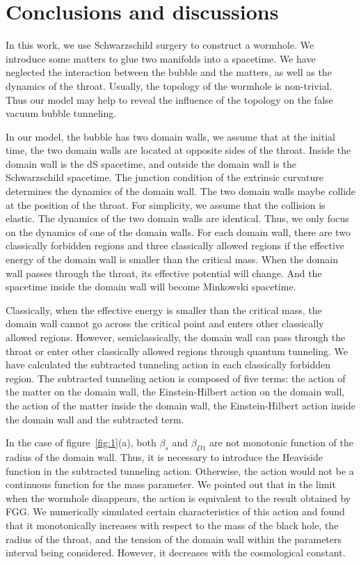 \documentclass[12pt]{article}
\begin{document}
\section{Conclusions and discussions}
\label{sec:5}
In this work, we use Schwarzschild surgery to construct a wormhole.  We introduce some matters to glue two manifolds into a spacetime. We have neglected the interaction between the bubble and the matters, as well as the dynamics of the throat. Usually, the topology of the wormhole is non-trivial. Thus our model may help to reveal the influence of the topology on the false vacuum bubble tunneling.

In our model, the bubble has two domain walls, we assume that at the initial time, the two domain walls are located at opposite sides of the throat.  Inside the domain wall is the dS spacetime, and outside the domain wall is the Schwarzschild spacetime. The junction condition of the extrinsic curvature determines the dynamics of the domain wall. The two domain walls maybe collide at the position of the throat. For simplicity, we assume that the collision is elastic. The dynamics of the two domain walls are identical. Thus, we only focus on the dynamics of one of the domain walls. For each domain wall, there are two classically forbidden regions and three classically allowed regions if the effective  energy of the domain wall is smaller than the critical mass. When the domain wall passes through the throat, its effective potential will change. And the spacetime inside the domain wall will become Minkowski spacetime.

Classically, when the effective energy is smaller than the critical mass, the domain wall cannot go across the critical point and enters other classically allowed regions.  However, semiclassically, the domain wall can pass through the throat or enter other classically allowed regions through quantum tunneling. We have calculated the subtracted tunneling action in each classically forbidden region. The subtracted tunneling action is composed of five terms: the action of the matter on the domain wall, the Einstein-Hilbert action on the domain wall, the action of the matter inside the domain wall, the Einstein-Hilbert action inside the domain wall and the subtracted term.

In the case of figure~\ref{fig:1}(a), both $\beta_{s}$ and $\beta_{D1}$ are not monotonic function of the radius of the domain wall. Thus, it is necessary to introduce the Heaviside function in the subtracted tunneling action. Otherwise, the action would not be a continuous function for the mass parameter. We pointed out that in the limit when the wormhole disappears, the action is equivalent to the result obtained by FGG.  We numerically simulated certain characteristics of this action and found that it monotonically increases with respect to the mass of the black hole, the radius of the throat, and the tension of the domain wall within the parameters interval being considered. However, it decreases with the cosmological constant.
\end{document}
